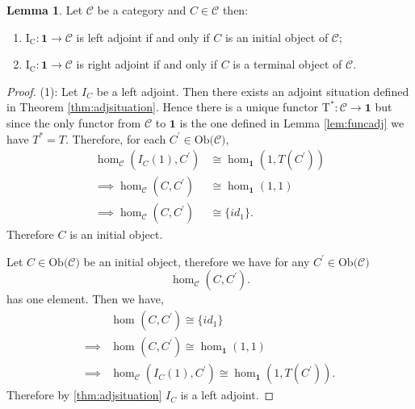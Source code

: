 \documentclass[11pt,a4paper]{article}
\theoremstyle{definition}
\newtheorem{lemma}[thm]{Lemma}
\newcommand\ho[3][]{\hom_{#1}(#2,#3)}
\newcommand\ob[1]{\mathrm{Ob(}#1\mathrm{)}}
\newcommand\cat[1]{\mathscr{#1}}
\newcommand\func[3]{\mathrm{#1}\colon#2\rightarrow#3}
\numberwithin{equation}{section}
\begin{document}
\begin{lemma}
    \label{lem:initermadj}
    Let $\cat{C}$ be a category and $C\in\cat{C}$ then: \begin{enumerate}
        \item $\func{I_{C}}{\mathbf{1}}{\cat{C}}$ is left adjoint if and only if $C$ is an initial object of $\cat{C}$;
        \item $\func{I_{C}}{\mathbf{1}}{\cat{C}}$ is right adjoint if and only if $C$ is a terminal object of $\cat{C}$.
    \end{enumerate}
\end{lemma}
\begin{proof}
    (1):
    Let $I_{C}$ be a left adjoint. Then there exists an adjoint situation defined in Theorem \ref{thm:adjsituation}. Hence there is a unique functor $\func{T^*}{\cat{C}}{\mathbf{1}}$ but since the only functor from $\cat{C}$ to $\mathbf{1}$ is the one defined in Lemma \ref{lem:funcadj} we have $T^* = T$. Therefore, for each $C^\prime\in\ob{\cat{C}}$, 
    \begin{align*}
    \ho[\cat{C}]{I_{C}(1)}{C^\prime}&\cong \ho[\mathbf{1}]{1}{T(C^\prime)}\\
    \implies \ho[\cat{C}]{C}{C^\prime}&\cong \ho[\mathbf{1}]{1}{1}\\
    \implies \ho[\cat{C}]{C}{C^\prime}&\cong \{id_{1}\}.
    \end{align*}
    Therefore $C$ is an initial object.
    
    Let $C\in\ob{\cat{C}}$ be an initial object, therefore we have for any $C^\prime \in\ob{\cat{C}}$\[\ho[\cat{C}]{C}{C^\prime}.\] has one element. Then we have,
    \begin{align*}
        &\ho{C}{C^\prime}\cong \{id_{1}\}\\
        \implies& \ho{C}{C^\prime}\cong \ho[\mathbf{1}]{1}{1}\\
        \implies &\ho[\cat{C}]{I_{C}(1)}{C^\prime}\cong \ho[\mathbf{1}]{1}{T(C^\prime)}.
    \end{align*}
    Therefore by \ref{thm:adjsituation} $I_{C}$ is a left adjoint.
    

\end{proof}
\end{document}
